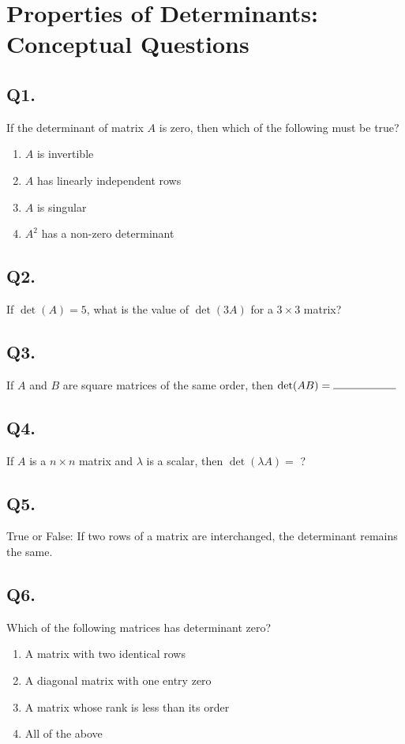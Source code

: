 \section{Properties of Determinants: Conceptual Questions}

\subsection*{Q1.}
If the determinant of matrix $A$ is zero, then which of the following must be true?
\begin{enumerate}[label=(\alph*)]
    \item $A$ is invertible
    \item $A$ has linearly independent rows
    \item $A$ is singular
    \item $A^2$ has a non-zero determinant
\end{enumerate}

\subsection*{Q2.}
If $\det(A) = 5$, what is the value of $\det(3A)$ for a $3 \times 3$ matrix?

\subsection*{Q3.}
If $A$ and $B$ are square matrices of the same order, then $\det(AB) = \rule{2cm}{0.15mm}$

\subsection*{Q4.}
If $A$ is a $n \times n$ matrix and $\lambda$ is a scalar, then $\det(\lambda A) = $ ?

\subsection*{Q5.}
True or False: If two rows of a matrix are interchanged, the determinant remains the same.

\subsection*{Q6.}
Which of the following matrices has determinant zero?
\begin{enumerate}[label=(\alph*)]
    \item A matrix with two identical rows
    \item A diagonal matrix with one entry zero
    \item A matrix whose rank is less than its order
    \item All of the above
\end{enumerate}

